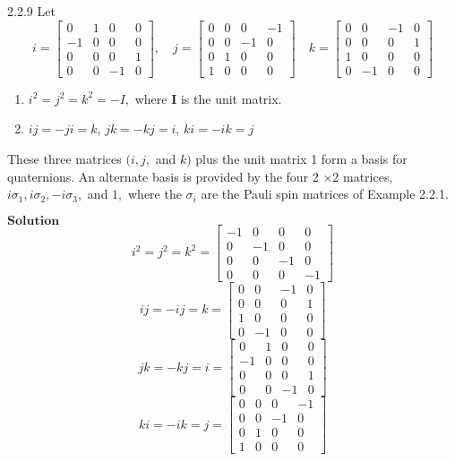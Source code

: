 \documentclass{styles/kaobook}
\begin{document}
\begin{greenbox}{2.2.9}
Let
$$
i=\begin{bmatrix}{0} & {1} & {0} & {0} \\ {-1} & {0} & {0} & {0} \\ {0} & {0} & {0} & {1} \\ {0} & {0} & {-1} & {0}\end{bmatrix}, \quad j=\begin{bmatrix}{0} & {0} & {0} & {-1} \\ {0} & {0} & {-1} & {0} \\ {0} & {1} & {0} & {0} \\ {1} & {0} & {0} & {0}\end{bmatrix} \quad k=\begin{bmatrix}{0} & {0} & {-1} & {0} \\ {0} & {0} & {0} & {1} \\ {1} & {0} & {0} & {0} \\ {0} & {-1} & {0} & {0}\end{bmatrix}
$$

\begin{enumerate}[$(a)$]
\item $i^{2}=j^{2}=k^{2}=-I,$ where $\mathbf{I}$ is the unit matrix. 
\item $ij=-ji=k$, $jk=-k j=i$, $ki=-ik=j$
\end{enumerate}

These three matrices $(i, j,$ and $k)$ plus the unit matrix 1 form a basis for quaternions. An alternate basis is provided by the four 2 $\times 2$ matrices, $i \sigma_{1}, i \sigma_{2},-i \sigma_{3},$ and $1,$ where the $\sigma_{i}$ are the Pauli spin matrices of Example 2.2.1.
\end{greenbox}


$\boxed{\textbf{Solution}}$ 
$$i^2=j^2 = k^2 =\begin{bmatrix}{-1} & {0} & {0} & {0} \\ {0} & {-1} & {0} & {0} \\ {0} & {0} & {-1} & {0} \\ {0} & {0} & {0} & {-1}\end{bmatrix}$$
$$ij = -ij = k =\begin{bmatrix}{0} & {0} & {-1} & {0} \\ {0} & {0} & {0} & {1} \\ {1} & {0} & {0} & {0} \\ {0} & {-1} & {0} & {0}\end{bmatrix} $$
$$jk=-kj=i=\begin{bmatrix}{0} & {1} & {0} & {0} \\ {-1} & {0} & {0} & {0} \\ {0} & {0} & {0} & {1} \\ {0} & {0} & {-1} & {0}\end{bmatrix}$$
$$ki=-ik=j = \begin{bmatrix}{0} & {0} & {0} & {-1} \\ {0} & {0} & {-1} & {0} \\ {0} & {1} & {0} & {0} \\ {1} & {0} & {0} & {0}\end{bmatrix}$$
\end{document}
